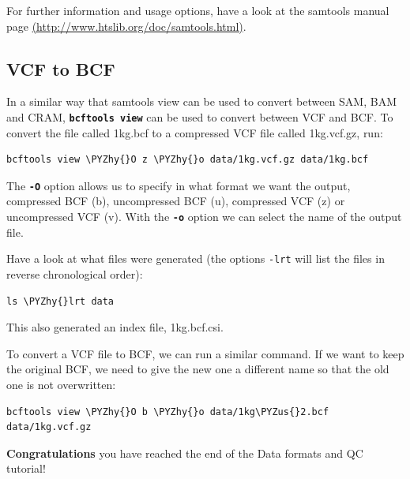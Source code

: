\documentclass[11pt]{article}
\makeatletter
\def\PYZus{\char`\_}
\def\PYZhy{\char`\-}
\newcommand{\boxspacing}{\kern\kvtcb@left@rule\kern\kvtcb@boxsep}
\newcommand{\prompt}[4]{
        {\ttfamily\llap{{\color{#2}[#3]:\hspace{3pt}#4}}\vspace{-\baselineskip}}
    }
\makeatother
\begin{document}
    For further information and usage options, have a look at the samtools
manual page
\href{http://www.htslib.org/doc/samtools.html}{(http://www.htslib.org/doc/samtools.html)}.

    \hypertarget{vcf-to-bcf}{%
\subsection{VCF to BCF}\label{vcf-to-bcf}}

In a similar way that samtools view can be used to convert between SAM,
BAM and CRAM, \textbf{\texttt{bcftools\ view}} can be used to convert
between VCF and BCF. To convert the file called 1kg.bcf to a compressed
VCF file called 1kg.vcf.gz, run:

    \begin{tcolorbox}[breakable, size=fbox, boxrule=1pt, pad at break*=1mm,colback=cellbackground, colframe=cellborder]
\prompt{In}{incolor}{ }{\boxspacing}
\begin{Verbatim}[commandchars=\\\{\}]
bcftools view \PYZhy{}O z \PYZhy{}o data/1kg.vcf.gz data/1kg.bcf
\end{Verbatim}
\end{tcolorbox}

    The \textbf{\texttt{-O}} option allows us to specify in what format we
want the output, compressed BCF (b), uncompressed BCF (u), compressed
VCF (z) or uncompressed VCF (v). With the \textbf{\texttt{-o}} option we
can select the name of the output file.

Have a look at what files were generated (the options \texttt{-lrt} will
list the files in reverse chronological order):

    \begin{tcolorbox}[breakable, size=fbox, boxrule=1pt, pad at break*=1mm,colback=cellbackground, colframe=cellborder]
\prompt{In}{incolor}{ }{\boxspacing}
\begin{Verbatim}[commandchars=\\\{\}]
ls \PYZhy{}lrt data
\end{Verbatim}
\end{tcolorbox}

    This also generated an index file, 1kg.bcf.csi.

    To convert a VCF file to BCF, we can run a similar command. If we want
to keep the original BCF, we need to give the new one a different name
so that the old one is not overwritten:

    \begin{tcolorbox}[breakable, size=fbox, boxrule=1pt, pad at break*=1mm,colback=cellbackground, colframe=cellborder]
\prompt{In}{incolor}{ }{\boxspacing}
\begin{Verbatim}[commandchars=\\\{\}]
bcftools view \PYZhy{}O b \PYZhy{}o data/1kg\PYZus{}2.bcf data/1kg.vcf.gz
\end{Verbatim}
\end{tcolorbox}

    \textbf{Congratulations} you have reached the end of the Data formats
and QC tutorial!


\end{document}
